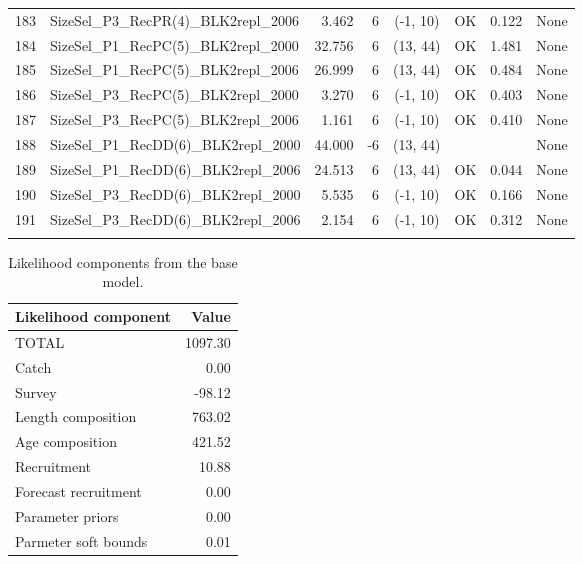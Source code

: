 \documentclass[12pt,]{article}
\begin{document}
\begin{landscape}
\begin{longtable}{rlrrcccl}
  183 & SizeSel\_P3\_RecPR(4)\_BLK2repl\_2006 & 3.462 & 6 & (-1, 10) & OK & 0.122 & None \\ 
  184 & SizeSel\_P1\_RecPC(5)\_BLK2repl\_2000 & 32.756 & 6 & (13, 44) & OK & 1.481 & None \\ 
  185 & SizeSel\_P1\_RecPC(5)\_BLK2repl\_2006 & 26.999 & 6 & (13, 44) & OK & 0.484 & None \\ 
  186 & SizeSel\_P3\_RecPC(5)\_BLK2repl\_2000 & 3.270 & 6 & (-1, 10) & OK & 0.403 & None \\ 
  187 & SizeSel\_P3\_RecPC(5)\_BLK2repl\_2006 & 1.161 & 6 & (-1, 10) & OK & 0.410 & None \\ 
  188 & SizeSel\_P1\_RecDD(6)\_BLK2repl\_2000 & 44.000 & -6 & (13, 44) &  &  & None \\ 
  189 & SizeSel\_P1\_RecDD(6)\_BLK2repl\_2006 & 24.513 & 6 & (13, 44) & OK & 0.044 & None \\ 
  190 & SizeSel\_P3\_RecDD(6)\_BLK2repl\_2000 & 5.535 & 6 & (-1, 10) & OK & 0.166 & None \\ 
  191 & SizeSel\_P3\_RecDD(6)\_BLK2repl\_2006 & 2.154 & 6 & (-1, 10) & OK & 0.312 & None \\ 
   \hline
\hline
\label{tab:model_params}
\end{longtable}
\end{landscape}

\FloatBarrier

\begin{table}[ht]
\centering
\caption{Likelihood components from the base model.} 
\label{tab:like_components}
\begin{tabular}{lr}
  \hline
Likelihood component & Value \\ 
  \hline
TOTAL & 1097.30 \\ 
  Catch & 0.00 \\ 
  Survey & -98.12 \\ 
  Length composition & 763.02 \\ 
  Age composition & 421.52 \\ 
  Recruitment & 10.88 \\ 
  Forecast recruitment & 0.00 \\ 
  Parameter priors & 0.00 \\ 
  Parmeter soft bounds & 0.01 \\ 
   \hline
\end{tabular}
\end{table}

\newpage
\end{document}
